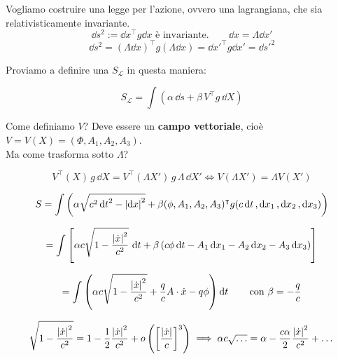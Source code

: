 Vogliamo costruire una legge per l'azione, ovvero una lagrangiana, che sia relativisticamente invariante.
\begin{equation*}
    \dd{s^2}:=\dd{x}^\intercal g \dd{x} \text{ è invariante.} \qquad    \dd{x} = \Lambda\dd{x'}
\end{equation*}
\begin{equation*}
    \dd{s^2}=(\Lambda\dd{x})^\intercal g (\Lambda\dd{x})=\dd{x'}^\intercal g \dd{x'}= \dd{s'^2}
\end{equation*}

Proviamo a definire una \( S_\mathcal{L} \) in questa maniera:

\begin{equation}
S_\mathcal{L} = \int \left( \alpha \, \dd{s} + \beta \, V^\intercal g \, \dd{X} \right)
\end{equation}

Come definiamo \( V \)? Deve essere un \textbf{campo vettoriale}, cioè $V= V(X)= \left( \Phi,A_1,A_2,A_3 \right)$.\\
Ma come trasforma sotto $\Lambda$?

\begin{equation}
V^\intercal(X) \, g \, \dd{X} = V^\intercal (\Lambda X')\, g \, \Lambda \, \dd{X'}
\iff V(\Lambda X') = \Lambda V(X')
\end{equation}


\begin{equation*}
S = \int \left( \alpha \sqrt{c^2 \dd{t}^2 - \abs{\dd{x}}^2} + \beta (\phi, A_1,A_2,A_3)^\intercal g (c\dd{t}, \dd{x}_1,\dd{x}_2,\dd{x}_3) \right)
\end{equation*}

\begin{equation*}
= \int \left[ \alpha c \sqrt{1 - \frac{\abs{\dot{x}}^2}{c^2}} \, \dd{t} + \beta \left( c \phi \dd{t} - A_1 \dd{x}_1 - A_2 \dd{x}_2 - A_3 \dd{x}_3 \right) \right]
\end{equation*}

\begin{equation}
= \int \left( \alpha c \sqrt{1 - \frac{\abs{\dot{x}}^2}{c^2}} + \frac{q}{c} A \cdot \dot{x} - q \phi \right) \dd{t}
\qquad \text{con } \beta = -\frac{q}{c}
\end{equation}

\begin{equation}
\sqrt{1 - \frac{\abs{\dot{x}}^2}{c^2}} = 1 - \frac{1}{2} \frac{\abs{\dot{x}}^2}{c^2} + o\left( \left[ \frac{\abs{\dot{x}}}{c} \right]^3 \right)
\implies \alpha c \sqrt{\dots} = \alpha - \frac{c \alpha}{2} \frac{\abs{\dot{x}}^2}{c^2} + \dots
\end{equation}

